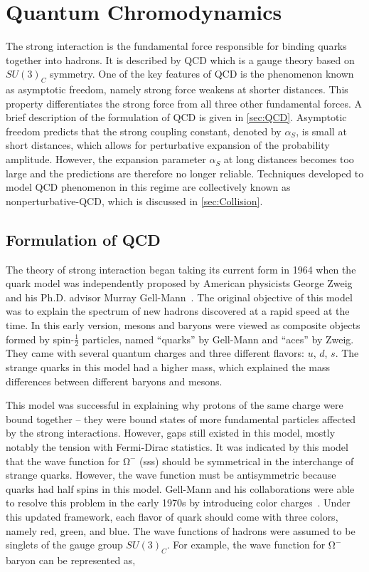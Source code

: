 \chapter{Quantum Chromodynamics}
\label{chap:QCD}

The strong interaction is the fundamental force responsible for binding quarks together into hadrons. It is described by \ac{QCD} which is a gauge theory based on $SU(3)_{C}$ symmetry. One of the key features of \ac{QCD} is the phenomenon known as asymptotic freedom, namely strong force weakens at shorter distances. This property differentiates the strong force from all three other fundamental forces. A brief description of the formulation of \ac{QCD} is given in \autoref{sec:QCD}. Asymptotic freedom predicts that the strong coupling constant, denoted by $\alpha_{S}$, is small at short distances, which allows for perturbative expansion of the probability amplitude. However, the expansion parameter $\alpha_{S}$ at long distances becomes too large and the predictions are therefore no longer reliable. Techniques developed to model \ac{QCD} phenomenon in this regime are collectively known as nonperturbative-\ac{QCD}, which is discussed in \autoref{sec:Collision}.

\section{Formulation of QCD}
\label{sec:QCD}

The theory of strong interaction began taking its current form in 1964 when the quark model was independently proposed by American physicists George Zweig~\cite{Zweig:1964ruk} and his Ph.D. advisor Murray Gell-Mann~\cite{Gell-Mann:1964ewy}. The original objective of this model was to explain the spectrum of new hadrons discovered at a rapid speed at the time. In this early version, mesons and baryons were viewed as composite objects formed by spin-$\frac{1}{2}$ particles, named ``quarks'' by Gell-Mann and ``aces'' by Zweig. They came with several quantum charges and three different flavors: $u$, $d$, $s$. The strange quarks in this model had a higher mass, which explained the mass differences between different baryons and mesons.

This model was successful in explaining why protons of the same charge were bound together -- they were bound states of more fundamental particles affected by the strong interactions. However, gaps still existed in this model, mostly notably the tension with Fermi-Dirac statistics. It was indicated by this model that the wave function for $\mathrm{\Omega^{-}}$ (sss) should be symmetrical in the interchange of strange quarks. However, the wave function must be antisymmetric because quarks had half spins in this model. Gell-Mann and his collaborations were able to resolve this problem in the early 1970s by introducing color charges~\cite{Fritzsch:1973pi}. Under this updated framework, each flavor of quark should come with three colors, namely red, green, and blue. The wave functions of hadrons were assumed to be singlets of the gauge group $SU(3)_{C}$. For example, the wave function for $\mathrm{\Omega^{-}}$ baryon can be represented as,

